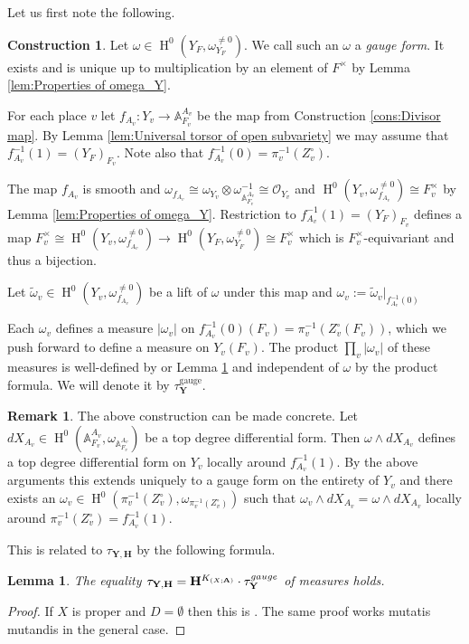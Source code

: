 \documentclass[a4paper,11pt,reqno]{amsart}
\newcommand{\A}{\mathbb{A}}
\DeclareMathOperator{\HH}{H}
\newtheorem{lemma}[theorem]{Lemma}
\theoremstyle{definition}
\newtheorem{remark}[theorem]{Remark}
\newtheorem{construction}[theorem]{Construction}
\begin{document}
Let us first note the following.
\begin{construction}\label{cons:measure gauge form}
	Let $\omega \in \HH^0(Y_F, \omega_{Y_F}^{\neq 0})$. We call such an $\omega$ a \emph{gauge form}. It exists and is unique up to multiplication by an element of $F^{\times}$ by Lemma \ref{lem:Properties of omega_Y}. 
	
	For each place $v$ let $f_{A_v}: Y_v \to \A_{F_v}^{A_v}$ be the map from Construction \ref{cons:Divisor map}. By Lemma \ref{lem:Universal torsor of open subvariety} we may assume that $f_{A_v}^{-1}(1) = (Y_F)_{F_v}$. Note also that $f_{A_v}^{-1}(0) = \pi_v^{-1}(Z_v^{\circ})$.
	
	The map $f_{A_v}$ is smooth and $\omega_{f_{A_v}} \cong \omega_{Y_v} \otimes \omega_{\A_{F_v}^{A_v}}^{-1} \cong \mathcal{O}_{Y_v}$ and $\HH^0(Y_v, \omega_{f_{A_v}}^{\neq 0}) \cong F_v^{\times}$ by Lemma \ref{lem:Properties of omega_Y}. Restriction to $f_{A_v}^{-1}(1) = (Y_F)_{F_v}$ defines a map $F_v^{\times} \cong \HH^0(Y_v, \omega_{f_{A_v}}^{\neq 0}) \to \HH^0(Y_F, \omega_{Y_F}^{\neq 0}) \cong F_v^{\times}$ which is $F_v^{\times}$-equivariant and thus a bijection. 
	
	Let $\tilde{\omega}_v \in \HH^0(Y_v, \omega_{f_{A_v}}^{\neq 0})$ be a lift of $\omega$ under this map and $\omega_v := \tilde{\omega}_v|_{f_{A_v}^{-1}(0)}$
	
	Each $\omega_v$ defines a measure $|\omega_v|$ on $f_{A_v}^{-1}(0)(F_v) = \pi_v^{-1}(Z_v^{\circ}(F_v))$, which we push forward to define a measure on $Y_v(F_v)$. The product $\prod_v |\omega_v|$ of these measures is well-defined by \cite[Rem.~2.9(c)]{Chambert-Loir2010Igusa} or Lemma \ref{lem:Comparison Gauge and Height measure} and independent of $\omega$ by the product formula. We will denote it by $\tau_{\mathbf{Y}}^{\text{gauge}}$.
\end{construction} 
\begin{remark}\label{rem:gauge forms}
	The above construction can be made concrete. Let $d X_{A_v} \in \HH^0(\A_{F_v}^{A_v}, \omega_{\A_{F_v}^{A_v}})$ be a top degree differential form. Then $\omega \wedge d X_{A_v}$ defines a top degree differential form on $Y_v$ locally around $f_{A_v}^{-1}(1)$. By the above arguments this extends uniquely to a gauge form on the entirety of $Y_v$ and there exists an $\omega_v \in \HH^0(\pi_v^{-1}(Z_v^{\circ}), \omega_{\pi_v^{-1}(Z_v^{\circ})})$ such that $\omega_v \wedge d X_{A_v} = \omega \wedge d X_{A_v}$ locally around $\pi_v^{-1}(Z_v^{\circ}) = f_{A_v}^{-1}(1)$.
\end{remark}
This is related to $\tau_{\mathbf{Y}, \mathbf{H}}$ by the following formula.
\begin{lemma}\label{lem:Comparison Gauge and Height measure}
	The equality $\tau_{\mathbf{Y}, \mathbf{H}} = \mathbf{H}^{K_{(X; \mathbf{A})}} \cdot \tau_{\mathbf{Y}}^{\emph{gauge}}$ of measures holds.
\end{lemma}
\begin{proof}
	If $X$ is proper and $D = \emptyset$ then this is \cite[Lem.~3.1.14]{Peyre2001Torseur}. The same proof works mutatis mutandis in the general case.
\end{proof}
\end{document}
